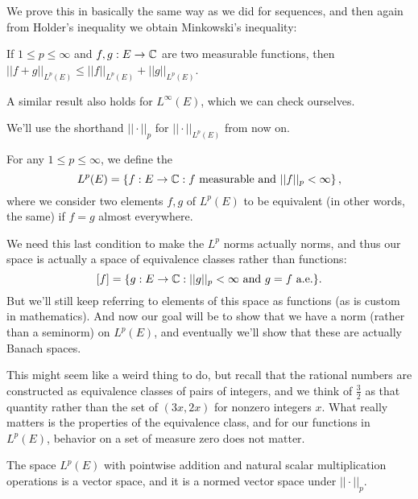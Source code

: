 We prove this in basically the same way as we did for sequences, and then again from Holder's inequality we obtain Minkowski's inequality:

\begin{theorem}
If $1 \le p \le \infty$ and $f, g: E \to \mathbb C$ are two measurable functions, then $||f+g||_{L^p(E)} \le ||f||_{L^p(E)} + ||g||_{L^p(E)}$.
\end{theorem}

A similar result also holds for $L^{\infty}(E)$, which we can check ourselves.

\begin{fact}
We'll use the shorthand $||\cdot||_p$ for $||\cdot||_{L^p(E)}$ from now on.
\end{fact}

\begin{definition}
For any $1 \le p \le \infty$, we define the  
\[
    L^p(E) = \left\{f: E \to \mathbb C: f \text{ measurable and }||f||_p < \infty\right\},
\]
where we consider two elements $f, g$ of $L^p(E)$ to be equivalent (in other words, the same) if $f = g$ almost everywhere.
\end{definition}

We need this last condition to make the $L^p$ norms actually norms, and thus our space is actually a space of equivalence classes rather than functions:
\[
    [f] = \{g: E \to \mathbb C: ||g||_{p} < \infty \text{ and } g = f \text{ a.e.}\}.
\]
But we'll still keep referring to elements of this space as functions (as is custom in mathematics). And now our goal will be to show that we have a norm (rather than a seminorm) on $L^p(E)$, and eventually we'll show that these are actually Banach spaces.

\begin{remark}
This might seem like a weird thing to do, but recall that the rational numbers are constructed as equivalence classes of pairs of integers, and we think of $\frac{3}{2}$ as that quantity rather than the set of $(3x, 2x)$ for nonzero integers $x$. What really matters is the properties of the equivalence class, and for our functions in $L^p(E)$, behavior on a set of measure zero does not matter.
\end{remark}

\begin{theorem}
The space $L^p(E)$ with pointwise addition and natural scalar multiplication operations is a vector space, and it is a normed vector space under $||\cdot||_p$.
\end{theorem}
 
